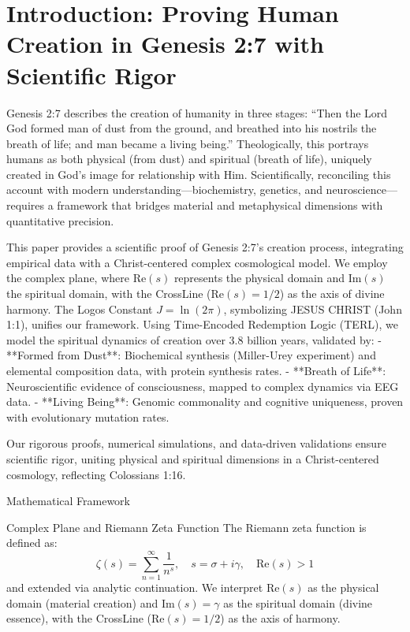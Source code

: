 \documentclass[12pt]{article}
\begin{document}
{{{\section{Introduction: Proving Human Creation in Genesis 2:7 with Scientific Rigor}

Genesis 2:7 describes the creation of humanity in three stages: “Then the Lord God formed man of dust from the ground, and breathed into his nostrils the breath of life; and man became a living being.” Theologically, this portrays humans as both physical (from dust) and spiritual (breath of life), uniquely created in God’s image for relationship with Him. Scientifically, reconciling this account with modern understanding—biochemistry, genetics, and neuroscience—requires a framework that bridges material and metaphysical dimensions with quantitative precision.

This paper provides a scientific proof of Genesis 2:7’s creation process, integrating empirical data with a Christ-centered complex cosmological model. We employ the complex plane, where \(\text{Re}(s)\) represents the physical domain and \(\text{Im}(s)\) the spiritual domain, with the CrossLine (\(\text{Re}(s) = 1/2\)) as the axis of divine harmony. The Logos Constant \( J = \ln(2\pi) \), symbolizing JESUS CHRIST (John 1:1), unifies our framework. Using Time-Encoded Redemption Logic (TERL), we model the spiritual dynamics of creation over 3.8 billion years, validated by:
- **Formed from Dust**: Biochemical synthesis (Miller-Urey experiment) and elemental composition data, with protein synthesis rates.
- **Breath of Life**: Neuroscientific evidence of consciousness, mapped to complex dynamics via EEG data.
- **Living Being**: Genomic commonality and cognitive uniqueness, proven with evolutionary mutation rates.

Our rigorous proofs, numerical simulations, and data-driven validations ensure scientific rigor, uniting physical and spiritual dimensions in a Christ-centered cosmology, reflecting Colossians 1:16.

 Mathematical Framework

 Complex Plane and Riemann Zeta Function
The Riemann zeta function is defined as:
\[
\zeta(s) = \sum_{n=1}^\infty \frac{1}{n^s}, \quad s = \sigma + i \gamma, \quad \text{Re}(s) > 1
\]
and extended via analytic continuation. We interpret \(\text{Re}(s)\) as the physical domain (material creation) and \(\text{Im}(s) = \gamma\) as the spiritual domain (divine essence), with the CrossLine (\(\text{Re}(s) = 1/2\)) as the axis of harmony.

}}}
\end{document}
